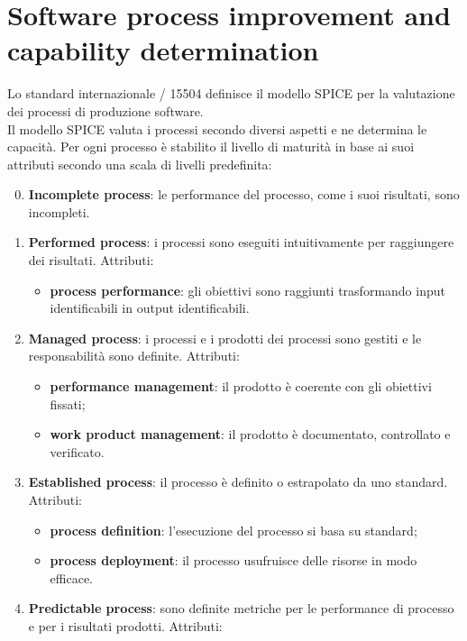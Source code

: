 \section{Software process improvement and capability determination}\label{app:spice}
Lo standard internazionale / 15504 definisce il modello SPICE per la valutazione dei processi di produzione software.\\
Il modello SPICE valuta i processi secondo diversi aspetti e ne determina le capacità.
Per ogni processo è stabilito il livello di maturità in base ai suoi attributi secondo una scala di livelli predefinita:
\begin{enumerate}
	\setcounter{enumi}{-1}
	\item \textbf{Incomplete process}: le performance del processo, come i suoi risultati, sono incompleti.
	\item \textbf{Performed process}: i processi sono eseguiti intuitivamente per raggiungere dei risultati. Attributi: 
		\begin{itemize}
			\item \textbf{process performance}: gli obiettivi sono raggiunti trasformando input identificabili in output identificabili.
		\end{itemize}
	\item \textbf{Managed process}: i processi e i prodotti dei processi sono gestiti e le responsabilità sono definite. Attributi:
		\begin{itemize}
			\item \textbf{performance management}: il prodotto è coerente con gli obiettivi fissati;
			\item \textbf{work product management}: il prodotto è documentato, controllato e verificato. 
		\end{itemize}
	\item \textbf{Established process}: il processo è definito o estrapolato da uno standard. Attributi:
		\begin{itemize}
			\item \textbf{process definition}: l'esecuzione del processo si basa su standard;
			\item \textbf{process deployment}: il processo usufruisce delle risorse in modo efficace.
		\end{itemize}
	\item \textbf{Predictable process}: sono definite metriche per le performance di processo e per i risultati prodotti. Attributi:
		\begin{itemize}

\end{itemize}
\end{enumerate}

